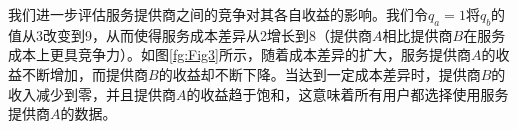 我们进一步评估服务提供商之间的竞争对其各自收益的影响。我们令$q_{a}=1$将$q_{b}$的值从3改变到9，从而使得服务成本差异从2增长到8（提供商$A$相比提供商$B$在服务成本上更具竞争力）。如图\ref{fg:Fig3}所示，随着成本差异的扩大，服务提供商$A$的收益不断增加，而提供商$B$的收益却不断下降。当达到一定成本差异时，提供商$B $的收入减少到零，并且提供商$A$的收益趋于饱和，这意味着所有用户都选择使用服务提供商$A$的数据。

